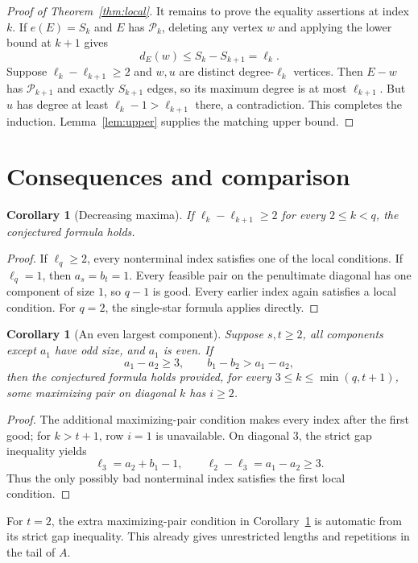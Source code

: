 \documentclass[11pt]{article}
\newtheorem{corollary}[theorem]{Corollary}
\theoremstyle{remark}\newtheorem{remark}[theorem]{Remark}
\begin{document}
\begin{proof}[Proof of Theorem~\ref{thm:local}]
It remains to prove the equality assertions at index $k$. If $e(E)=S_k$ and $E$ has $\mathcal P_k$, deleting any vertex $w$ and applying the lower bound at $k+1$ gives
\[
 d_E(w)\le S_k-S_{k+1}=\ell_k.
\]
Suppose $\ell_k-\ell_{k+1}\ge2$ and $w,u$ are distinct degree-$\ell_k$ vertices. Then $E-w$ has $\mathcal P_{k+1}$ and exactly $S_{k+1}$ edges, so its maximum degree is at most $\ell_{k+1}$. But $u$ has degree at least $\ell_k-1>\ell_{k+1}$ there, a contradiction. This completes the induction. Lemma~\ref{lem:upper} supplies the matching upper bound.
\end{proof}

\section{Consequences and comparison}

\begin{corollary}[Decreasing maxima]\label{cor:spacing}
If $\ell_k-\ell_{k+1}\ge2$ for every $2\le k<q$, the conjectured formula holds.
\end{corollary}
\begin{proof}
If $\ell_q\ge2$, every nonterminal index satisfies one of the local conditions. If $\ell_q=1$, then $a_s=b_t=1$. Every feasible pair on the penultimate diagonal has one component of size $1$, so $q-1$ is good. Every earlier index again satisfies a local condition. For $q=2$, the single-star formula applies directly.
\end{proof}

\begin{corollary}[An even largest component]\label{cor:even}
Suppose $s,t\ge2$, all components except $a_1$ have odd size, and $a_1$ is even. If
\[
 a_1-a_2\ge3,\qquad b_1-b_2>a_1-a_2,
\]
then the conjectured formula holds provided, for every $3\le k\le\min(q,t+1)$, some maximizing pair on diagonal $k$ has $i\ge2$.
\end{corollary}
\begin{proof}
The additional maximizing-pair condition makes every index after the first good; for $k>t+1$, row $i=1$ is unavailable. On diagonal $3$, the strict gap inequality yields
\[
 \ell_3=a_2+b_1-1,\qquad \ell_2-\ell_3=a_1-a_2\ge3.
\]
Thus the only possibly bad nonterminal index satisfies the first local condition.
\end{proof}

For $t=2$, the extra maximizing-pair condition in Corollary~\ref{cor:even} is automatic from its strict gap inequality. This already gives unrestricted lengths and repetitions in the tail of $A$.
\end{document}
